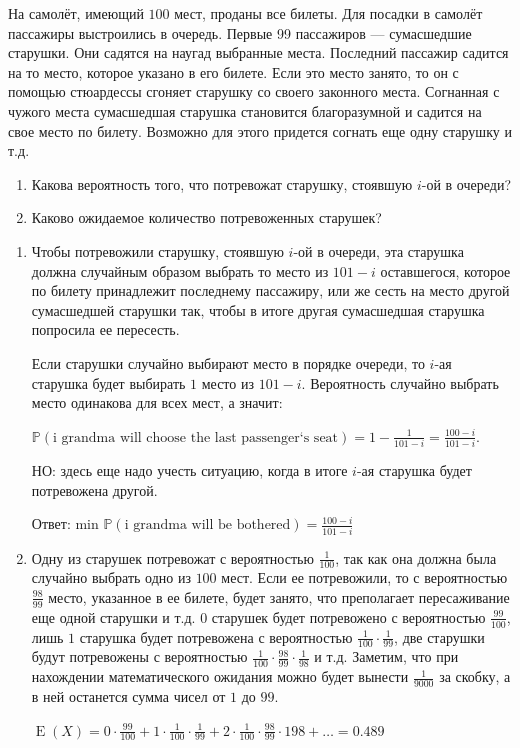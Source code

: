 \documentclass[nobib]{tufte-handout}
\theoremstyle{definition}
\newcounter{problem}
\newenvironment{problem}%
{%
\refstepcounter{problem}%
     \hypertarget{problem:{\theproblem}}{}
     \Writetofile{solution_file}{\protect\hypertarget{soln:\theproblem}{}}
     \begin{myenum}[label=\bfseries\protect\hyperlink{soln:\theproblem}{\theproblem},ref=\theproblem]
     \item%
    }%
    {%
    \end{myenum}}
\DeclareMathOperator{\E}{E}
\renewcommand{\P}{\mathbb{P}}
\begin{document}
\begin{problem}
На самолёт, имеющий $100$ мест, проданы все билеты. Для посадки в
самолёт пассажиры выстроились в очередь. Первые 99 пассажиров — сумасшедшие старушки. Они садятся
на наугад выбранные места. Последний пассажир садится на то место,
которое указано в его билете. Если это место занято, то он с
помощью стюардессы сгоняет старушку со своего законного места.
Согнанная с чужого места сумасшедшая старушка становится
благоразумной и садится на свое место по билету. Возможно для
этого придется согнать еще одну старушку и т.д.
\begin{enumerate}
\item Какова вероятность того, что потревожат старушку, стоявшую $i$-ой в очереди?
\item Каково ожидаемое количество потревоженных старушек?
\end{enumerate}

\begin{sol}
\begin{enumerate}
\item Чтобы потревожили старушку, стоявшую $i$-ой в очереди, эта старушка должна случайным образом выбрать то место из $101-i$ оставшегося, которое по билету принадлежит последнему пассажиру, или же сесть на место другой сумасшедшей старушки так, чтобы в итоге другая сумасшедшая старушка попросила ее пересесть.

Если старушки случайно выбирают место в порядке очереди, то $i$-ая старушка будет выбирать $1$ место из $101-i$. Вероятность случайно выбрать место одинакова для всех мест, а значит:

$\P(\text{i grandma will choose the last passenger`s seat})=1 - \frac{1}{101-i} = \frac{100-i}{101-i}$.

НО: здесь еще надо учесть ситуацию, когда в итоге $i$-ая старушка будет потревожена другой.

Ответ: min $\P(\text{i grandma will be bothered}) =\frac{100-i}{101-i}$

\item Одну из старушек потревожат с вероятностью $\frac{1}{100}$, так как она должна была случайно выбрать одно из $100$ мест. Если ее потревожили, то с вероятностью $\frac{98}{99}$ место, указанное в ее билете, будет занято, что преполагает пересаживание еще одной старушки и т.д. $0$ старушек будет потревожено с вероятностью $\frac{99}{100}$, лишь $1$ старушка будет потревожена с вероятностью $\frac{1}{100} \cdot \frac{1}{99}$, две старушки будут потревожены с вероятностью $\frac{1}{100} \cdot \frac{98}{99} \cdot \frac{1}{98}$ и т.д. Заметим, что при нахождении математического ожидания можно будет вынести $\frac{1}{9000}$ за скобку, а в ней останется сумма чисел  от $1$ до $99$.

$\E(X) = 0 \cdot \frac{99}{100} + 1 \cdot \frac{1}{100} \cdot \frac{1}{99} + 2\cdot \frac{1}{100} \cdot \frac{98}{99} \cdot {1}{98} + \ldots  = 0.489$
\end{enumerate}
\end{sol}

\end{problem}
\end{document}
